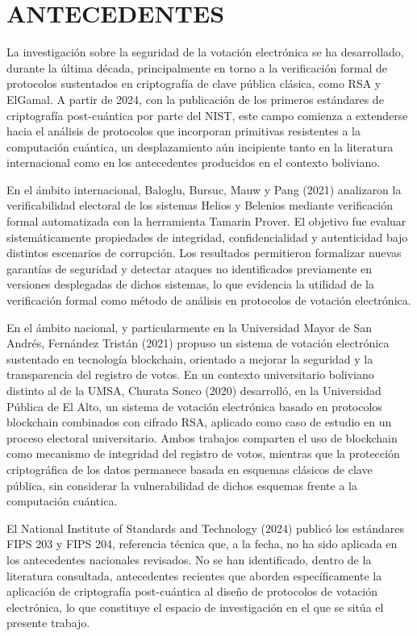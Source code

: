 \section{ANTECEDENTES}

La investigación sobre la seguridad de la votación electrónica se ha desarrollado, durante la última década, principalmente en torno a la verificación formal de protocolos sustentados en criptografía de clave pública clásica, como RSA y ElGamal. A partir de 2024, con la publicación de los primeros estándares de criptografía post-cuántica por parte del NIST, este campo comienza a extenderse hacia el análisis de protocolos que incorporan primitivas resistentes a la computación cuántica, un desplazamiento aún incipiente tanto en la literatura internacional como en los antecedentes producidos en el contexto boliviano.

En el ámbito internacional, Baloglu, Bursuc, Mauw y Pang (2021) analizaron la verificabilidad electoral de los sistemas Helios y Belenios mediante verificación formal automatizada con la herramienta Tamarin Prover. El objetivo fue evaluar sistemáticamente propiedades de integridad, confidencialidad y autenticidad bajo distintos escenarios de corrupción. Los resultados permitieron formalizar nuevas garantías de seguridad y detectar ataques no identificados previamente en versiones desplegadas de dichos sistemas, lo que evidencia la utilidad de la verificación formal como método de análisis en protocolos de votación electrónica.

En el ámbito nacional, y particularmente en la Universidad Mayor de San Andrés, Fernández Tristán (2021) propuso un sistema de votación electrónica sustentado en tecnología blockchain, orientado a mejorar la seguridad y la transparencia del registro de votos. En un contexto universitario boliviano distinto al de la UMSA, Churata Sonco (2020) desarrolló, en la Universidad Pública de El Alto, un sistema de votación electrónica basado en protocolos blockchain combinados con cifrado RSA, aplicado como caso de estudio en un proceso electoral universitario. Ambos trabajos comparten el uso de blockchain como mecanismo de integridad del registro de votos, mientras que la protección criptográfica de los datos permanece basada en esquemas clásicos de clave pública, sin considerar la vulnerabilidad de dichos esquemas frente a la computación cuántica.

El National Institute of Standards and Technology (2024) publicó los estándares FIPS 203 y FIPS 204, referencia técnica que, a la fecha, no ha sido aplicada en los antecedentes nacionales revisados. No se han identificado, dentro de la literatura consultada, antecedentes recientes que aborden específicamente la aplicación de criptografía post-cuántica al diseño de protocolos de votación electrónica, lo que constituye el espacio de investigación en el que se sitúa el presente trabajo.